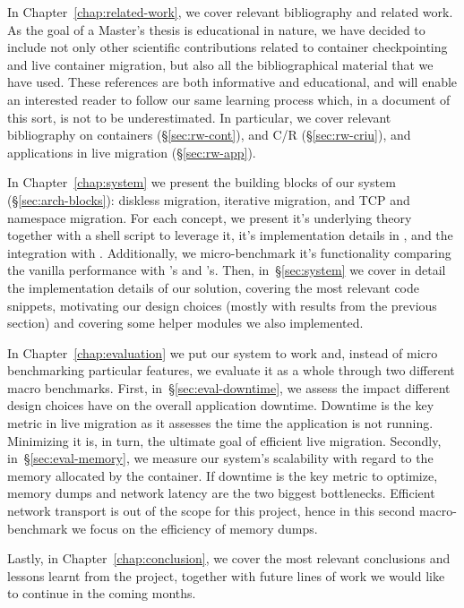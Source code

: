 In Chapter~\ref{chap:related-work}, we cover relevant bibliography and related work.
As the goal of a Master's thesis is educational in nature, we have decided to include not only other scientific contributions related to container checkpointing and live container migration, but also all the bibliographical material that we have used.
These references are both informative and educational, and will enable an interested reader to follow our same learning process which, in a document of this sort, is not to be underestimated.
In particular, we cover relevant bibliography on containers (\S\ref{sec:rw-cont}), \criu and C/R (\S\ref{sec:rw-criu}), and applications in live migration (\S\ref{sec:rw-app}).

In Chapter~\ref{chap:system} we present the building blocks of our system (\S\ref{sec:arch-blocks}): diskless migration, iterative migration, and TCP and namespace migration.
For each concept, we present it's underlying theory together with a shell script to leverage it, it's implementation details in \criu, and the integration with \runc.
Additionally, we micro-benchmark it's functionality comparing the vanilla performance with \criu's and \runc's.
Then, in~\S\ref{sec:system} we cover in detail the implementation details of our solution, covering the most relevant code snippets, motivating our design choices (mostly with results from the previous section) and covering some helper modules we also implemented.

In Chapter~\ref{chap:evaluation} we put our system to work and, instead of micro benchmarking particular features, we evaluate it as a whole through two different macro benchmarks.
First, in~\S\ref{sec:eval-downtime}, we assess the impact different design choices have on the overall application downtime.
Downtime is the key metric in live migration as it assesses the time the application is not running.
Minimizing it is, in turn, the ultimate goal of efficient live migration.
Secondly, in~\S\ref{sec:eval-memory}, we measure our system's scalability with regard to the memory allocated by the container.
If downtime is the key metric to optimize, memory dumps and network latency are the two biggest bottlenecks.
Efficient network transport is out of the scope for this project, hence in this second macro-benchmark we focus on the efficiency of memory dumps.

Lastly, in Chapter~\ref{chap:conclusion}, we cover the most relevant conclusions and lessons learnt from the project, together with future lines of work we would like to continue in the coming months.
